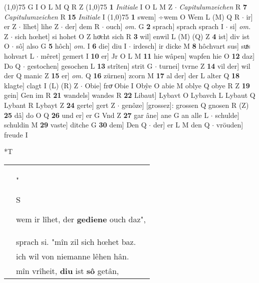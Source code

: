 \documentclass[8pt,a4paper,notitlepage]{article}
\begin{document}
\begin{table}[ht]
\begin{minipage}[t]{0.5\linewidth}
\begin{tabular}{rl}
\end{tabular}
\scriptsize
\line(1,0){75} \newline
G I O L M Q R Z \newline
\line(1,0){75} \newline
\textbf{1} \textit{Initiale} I O L M Z   $\cdot$ \textit{Capitulumzeichen} R  \textbf{7} \textit{Capitulumzeichen} R  \textbf{15} \textit{Initiale} I  \newline
\line(1,0){75} \newline
\textbf{1} swem] ÷wem O Wem L (M) Q R  $\cdot$ ir] er Z  $\cdot$ lîhet] lihe Z  $\cdot$ der] dem R  $\cdot$ ouch] \textit{om.} G \textbf{2} sprach] sprach sprach I  $\cdot$ si] \textit{om.} Z  $\cdot$ sich hœhet] si hohet O Z hoͯcht sich R \textbf{3} wil] enwil L (M) (Q) Z \textbf{4} ist] div ist O  $\cdot$ sô] also G \textbf{5} hôch] \textit{om.} I \textbf{6} die] diu I  $\cdot$ irdesch] ir dicke M \textbf{8} hôchvart sus] suͯs hohvart L  $\cdot$ mêret] gemert I \textbf{10} er] Jr O L M \textbf{11} hie wâpen] wapfen hie O \textbf{12} daz] Do Q  $\cdot$ gestochen] gesochen L \textbf{13} strîten] strit G  $\cdot$ turnei] tvrne Z \textbf{14} vil der] wil der Q manic Z \textbf{15} er] \textit{om.} Q \textbf{16} zürnen] zcorn M \textbf{17} al der] der L alter Q \textbf{18} klagte] clagt I (L) (R) Z  $\cdot$ Obie] froͮ Obie I Obŷe O abie M oblye Q obye R Z \textbf{19} gein] Gen im R \textbf{21} wandels] wandes R \textbf{22} Libaut] Lybavt O Lybavch L Lybaut Q Lybant R Lybayt Z \textbf{24} gerte] gert Z  $\cdot$ genôze] [grossez]: grossen Q gnosen R (Z) \textbf{25} dâ] do O Q \textbf{26} und er] er G Vnd Z \textbf{27} gar âne] ane G an alle L  $\cdot$ schulde] schuldin M \textbf{29} vaste] ditche G \textbf{30} dem] Den Q  $\cdot$ der] er L M den Q  $\cdot$ vröuden] freude I \newline
\end{minipage}
\hspace{0.5cm}
\begin{minipage}[t]{0.5\linewidth}
\small
\begin{center}*T
\end{center}
\begin{tabular}{rl}
 & "\begin{large}S\end{large}wem ir lîhet, der \textbf{gediene} ouch daz",\\ 
 & sprach si. "mîn zil sich hœhet baz.\\ 
 & ich wil von niemanne lêhen hân.\\ 
 & mîn vrîheit, \textbf{diu} ist \textbf{sô} getân,\\ 

\end{tabular}
\end{minipage}
\end{table}
\end{document}

